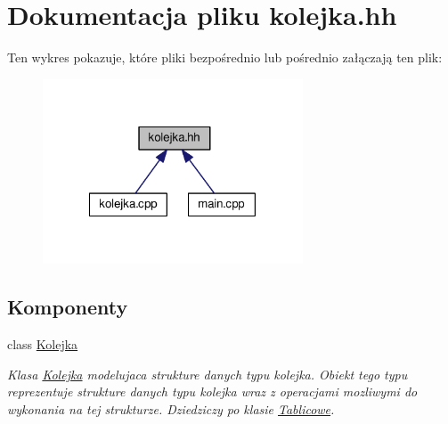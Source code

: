 \hypertarget{kolejka_8hh}{\section{Dokumentacja pliku kolejka.\-hh}
\label{kolejka_8hh}
}
Ten wykres pokazuje, które pliki bezpośrednio lub pośrednio załączają ten plik\-:\nopagebreak
\begin{figure}[H]
\begin{center}
\leavevmode
\includegraphics[width=219pt]{kolejka_8hh__dep__incl}
\end{center}
\end{figure}
\subsection*{Komponenty}
\begin{DoxyCompactItemize}
\item 
class \hyperlink{class_kolejka}{Kolejka}
\begin{DoxyCompactList}\small\item\em Klasa \hyperlink{class_kolejka}{Kolejka} modelujaca strukture danych typu kolejka. Obiekt tego typu reprezentuje strukture danych typu kolejka wraz z operacjami mozliwymi do wykonania na tej strukturze. Dziedziczy po klasie \hyperlink{class_tablicowe}{Tablicowe}. \end{DoxyCompactList}\end{DoxyCompactItemize}
